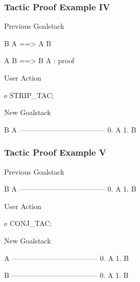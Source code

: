 \begin{frame}[fragile]
\frametitle{Tactic Proof Example IV}

\begin{block}{Previous Goalstack}
\begin{semiverbatim}
B \holAnd{} A ==> A \holAnd{} B

A \holAnd{} B ==> B \holAnd{} A : proof
\end{semiverbatim}
\end{block}

\begin{block}{User Action}
\begin{semiverbatim}
e STRIP_TAC;
\end{semiverbatim}
\end{block}

\begin{block}{New Goalstack}
\begin{semiverbatim}
B \holAnd{} A
------------------------------------
  0.  A
  1.  B
\end{semiverbatim}
\end{block}
\end{frame}

\begin{frame}[fragile]
\frametitle{Tactic Proof Example V}

\begin{block}{Previous Goalstack}
\begin{semiverbatim}
\scriptsize{}B \holAnd{} A
------------------------------------
  0.  A
  1.  B
\end{semiverbatim}
\end{block}

\begin{block}{User Action}
\begin{semiverbatim}
\scriptsize{}e CONJ_TAC;
\end{semiverbatim}
\end{block}

\begin{block}{New Goalstack}
\begin{semiverbatim}
\scriptsize{}A
------------------------------------
  0.  A
  1.  B

B
------------------------------------
  0.  A
  1.  B
\end{semiverbatim}
\end{block}
\end{frame}


